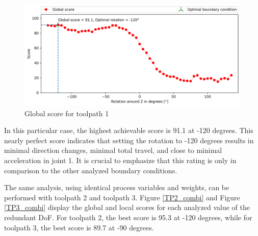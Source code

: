 \begin{figure}[H]
	\centerline{\includegraphics[width=1\textwidth]{figures/best_c_1.png}}
	\caption{Global score for toolpath 1}
	\label{GS1}
\end{figure}
In this particular case, the highest achievable score is 91.1 at -120 degrees. This nearly perfect score indicates that setting the rotation to -120 degrees results in minimal direction changes, minimal total travel, and close to minimal acceleration in joint 1. It is crucial to emphasize that this rating is only in comparison to the other analyzed boundary conditions.

The same analysis, using identical process variables and weights, can be performed with toolpath 2 and toolpath 3. Figure \ref{TP2_combi} and Figure \ref{TP3_combi} display the global and local scores for each analyzed value of the redundant \acrshort{DoF}. For toolpath 2, the best score is 95.3 at -120 degrees, while for toolpath 3, the best score is 89.7 at -90 degrees.
\newpage

